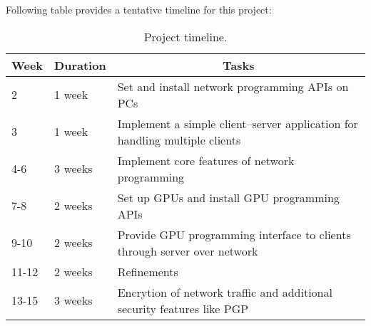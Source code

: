 \documentclass[11pt,a4paper]{article}
\begin{document}
Following table provides a tentative timeline for this project:

\begin{table}[h]
\begin{center}
\vspace{0.3cm}
	\begin{tabular}{llp{10cm}}
	\hline \hline
		\textbf{Week} \rule{0pt}{2.6ex} & \textbf{Duration} & \multicolumn{1}{c}{\textbf{Tasks}}\\
		\hline
		2 \rule{0pt}{2.6ex} & 1 week & Set and install network programming APIs on PCs\\
		3 & 1 week & Implement a simple client--server application for handling multiple clients\\
		4-6 & 3 weeks & Implement core features of network programming\\
		7-8 & 2 weeks & Set up GPUs and install GPU programming APIs\\
		9-10 & 2 weeks & Provide GPU programming interface to clients through server over network\\
		11-12 & 2 weeks & Refinements\\
		13-15 & 3 weeks & Encrytion of network traffic and additional security features like PGP\\
	\hline \hline
	\end{tabular}
\end{center}
\label{TimelineTable}
\caption{Project timeline.}
\end{table}
\nocite{*}








\end{document}
